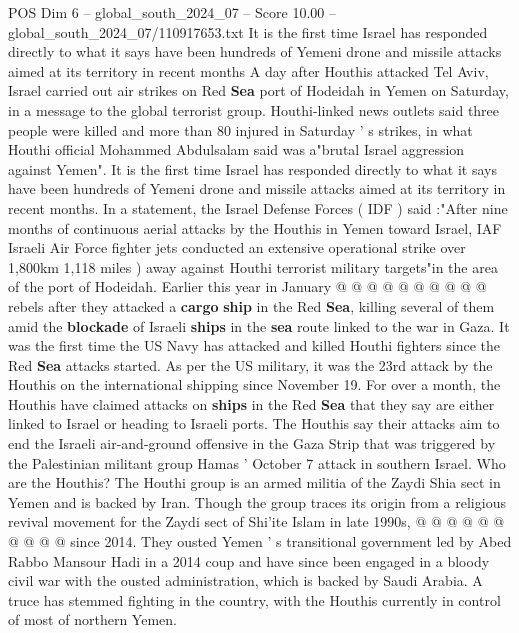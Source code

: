 \begin{textsample}{POS Dim 6 – global\_south\_2024\_07 – Score 10.00 – global\_south\_2024\_07/110917653.txt}  \label{ex:f6_pos_331}
It is the first time Israel has responded directly to what it says have been hundreds of Yemeni drone and missile attacks aimed at its territory in recent months A day after Houthis attacked Tel Aviv, Israel carried out air strikes on Red \textbf{Sea} port of Hodeidah in Yemen on Saturday, in a message to the global terrorist group.
Houthi-linked news outlets said three people were killed and more than 80 injured in Saturday ' s strikes, in what Houthi official Mohammed Abdulsalam said was a"brutal Israel aggression against Yemen".
It is the first time Israel has responded directly to what it says have been hundreds of Yemeni drone and missile attacks aimed at its territory in recent months.
In a statement, the Israel Defense Forces ( IDF ) said :"After nine months of continuous aerial attacks by the Houthis in Yemen toward Israel, IAF Israeli Air Force fighter jets conducted an extensive operational strike over 1,800km 1,118 miles ) away against Houthi terrorist military targets"in the area of the port of Hodeidah.
Earlier this year in January @ @ @ @ @ @ @ @ @ @ rebels after they attacked a \textbf{cargo} \textbf{ship} in the Red \textbf{Sea}, killing several of them amid the \textbf{blockade} of Israeli \textbf{ships} in the \textbf{sea} route linked to the war in Gaza.
It was the first time the US Navy has attacked and killed Houthi fighters since the Red \textbf{Sea} attacks started.
As per the US military, it was the 23rd attack by the Houthis on the international shipping since November 19.
For over a month, the Houthis have claimed attacks on \textbf{ships} in the Red \textbf{Sea} that they say are either linked to Israel or heading to Israeli ports.
The Houthis say their attacks aim to end the Israeli air-and-ground offensive in the Gaza Strip that was triggered by the Palestinian militant group Hamas ' October 7 attack in southern Israel.
Who are the Houthis?
The Houthi group is an armed militia of the Zaydi Shia sect in Yemen and is backed by Iran.
Though the group traces its origin from a religious revival movement for the Zaydi sect of Shi'ite Islam in late 1990s, @ @ @ @ @ @ @ @ @ @ since 2014.
They ousted Yemen ' s transitional government led by Abed Rabbo Mansour Hadi in a 2014 coup and have since been engaged in a bloody civil war with the ousted administration, which is backed by Saudi Arabia.
A truce has stemmed fighting in the country, with the Houthis currently in control of most of northern Yemen.

\end{textsample}
